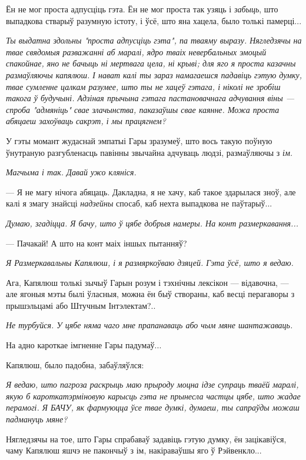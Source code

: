 Ён не мог проста адпусціць гэта. Ён не мог проста так узяць і \emph{забыць}, што выпадкова стварыў разумную 
істоту, і ўсё, што яна хацела, было толькі памерці...

\emph{Ты выдатна здольны "проста адпусціць гэта", па тваяму выразу. 
Нягледзячы на твае свядомыя разважанні аб маралі, ядро тваіх невербальных
эмоцый спакойнае, яно не бачыць ні мертвага цела, ні крыві; для яго я проста 
казачны размаўляючы капялюш. І нават калі ты зараз намагаешся 
падавіць гэтую думку, твае сумленне цалкам разумее, што ты не хацеў гэтага,
і ніколі не зробіш такога ў будучыні. Адзіная прычына гэтага пастановачнага 
адчування віны --- спроба "адмяніць" свае злачынства, паказаўшы свае каянне.
Можа проста абяцаеш захоўваць сакрэт, і мы працягнем?}

У гэты момант жудаснай эмпатыі Гары зразумеў, што вось такую поўную ўнутраную 
разгубленасць павінны звычайна адчуваць людзі, размаўляючы з  \emph{ім.}


\emph{Магчыма і так. Давай ужо кляніся.} 

--- Я не магу нічога абяцаць. Дакладна, я не хачу, каб такое здарылася зноў, але 
калі я змагу знайсці \emph{надзейны} спосаб, каб нехта выпадкова не паўтарыў...

\emph{Думаю, згадіцца. Я бачу, што ў цябе добрыя намеры. На конт размеркавання...}

--- Пачакай! А што на конт маіх іншых пытанняў?

\emph{Я Размеркавальны Капялюш, і я размяркоўваю дзяцей. Гэта ўсё, што я ведаю.}

Ага, Капялюш толькі зычыў Гарын розум і тэхнічны лексікон --- відавочна, --- 
але ягоныя мэты былі ўласныя, можна ён быў створаны, каб весці перагаворы з 
прышэльцамі або Штучным Інтэлектам?.. 

\emph{Не турбуйся. У цябе няма чаго мне прапанаваць або чым мяне шантажаваць.}

На адно кароткае імгненне Гары падумаў...

Капялюш, было падобна, забаўляўлся:

\emph{Я ведаю, што пагроза раскрыць маю прыроду моцна ідзе супраць тваёй маралі,
якую б кароткатэрміновую карысць гэта не прынесла частцы цябе, што жадае перамогі.
Я БАЧУ, як фармуюцца ўсе твае думкі, думаеш, ты сапраўды можаш падмануць мяне?}

Нягледзячы на тое, што Гары спрабаваў задавіць гэтую думку, ён зацікавіўся, чаму
Капялюш яшчэ не пакончыў з ім, накіраваўшы яго ў Рэйвенкло...

